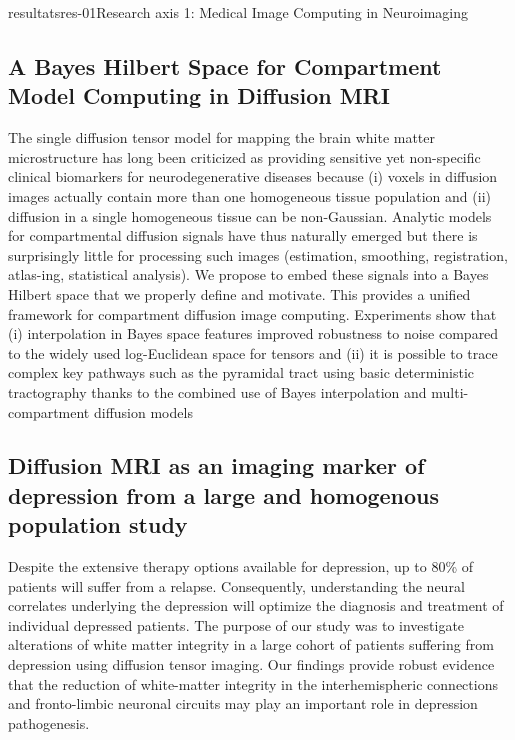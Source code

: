 \documentclass{ra2018}
\begin{document}
\begin{module}{resultats}{res-01}{Research axis 1: Medical Image Computing in Neuroimaging}
\subsection{A Bayes Hilbert Space for Compartment Model Computing in Diffusion MRI}
\begin{participants}
\end{participants}
The single diffusion tensor model for mapping the brain white matter microstructure has long been criticized as providing sensitive yet non-specific clinical biomarkers for neurodegenerative diseases because (i) voxels in diffusion images actually contain more than one homogeneous tissue population and (ii) diffusion in a single homogeneous tissue can be non-Gaussian. Analytic models for compartmental diffusion signals have thus naturally emerged but there is surprisingly little for processing such images (estimation, smoothing, registration, atlas-ing, statistical analysis). We propose to embed these signals into a Bayes Hilbert space that we properly define and motivate. This provides a unified framework for compartment diffusion image computing. Experiments show that (i) interpolation in Bayes space features improved robustness to noise compared to the widely used log-Euclidean space for tensors and (ii) it is possible to trace complex key pathways such as the pyramidal tract using basic deterministic tractography thanks to the combined use of Bayes interpolation and multi-compartment diffusion models~\cite{stamm:inserm-01937992}


\subsection{Diffusion MRI as an imaging marker of depression from a large and homogenous population study}
\begin{participants}
\end{participants}
Despite the extensive therapy options available for depression, up to 80\% of patients will suffer from a relapse. Consequently, understanding the neural correlates underlying the depression will optimize the diagnosis and treatment of individual depressed patients. The purpose of our study was to investigate alterations of white matter integrity in a large cohort of patients suffering from depression using diffusion tensor imaging. Our findings provide robust evidence that the reduction of white-matter integrity in the interhemispheric connections and fronto-limbic neuronal circuits may play an important role in depression pathogenesis.~\cite{coloigner:hal-01812093}


\end{module}
\end{document}
